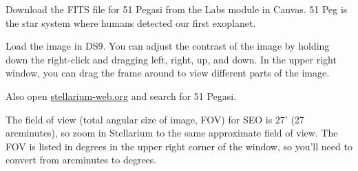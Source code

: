 
\begin{steps}
	\item Download the FITS file for 51 Pegasi from the Labs module in Canvas. 51 Peg is the star system where humans detected our first exoplanet.


	\item Load the image in DS9. You can adjust the contrast of the image by holding down the right-click and dragging left, right, up, and down. In the upper right window, you can drag the frame around to view different parts of the image.



	\item Also open \url{stellarium-web.org} and search for 51 Pegasi.


	\item The field of view (total angular size of image, FOV) for SEO is 27' (27 arcminutes), so zoom in Stellarium to the same approximate field of view. The FOV is listed in degrees in the upper right corner of the window, so you'll need to convert from arcminutes to degrees.


\end{steps}

